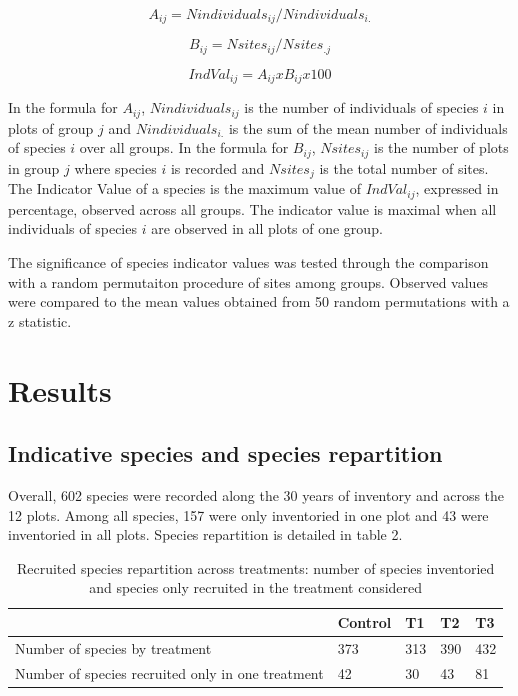 \documentclass[fleqn,10pt]{ArtEcoFoG} %
\begin{document}
\begin{equation}
A_{ij} = Nindividuals_{ij} / Nindividuals_{i.}
\end{equation}

\begin{equation}
B_{ij} = Nsites_{ij} / Nsites_{.j}
\end{equation}

\begin{equation}
IndVal_{ij} = A_{ij} x B_{ij} x 100
\end{equation}

In the formula for \(A_{ij}\), \(Nindividuals_{ij}\) is the number of individuals of species \(i\) in plots of group \(j\) and \(Nindividuals_{i.}\) is the sum of the mean number of individuals of species \(i\) over all groups.
In the formula for \(B_{ij}\), \(Nsites_{ij}\) is the number of plots in group \(j\) where species \(i\) is recorded and \(Nsites_{j}\) is the total number of sites.
The Indicator Value of a species is the maximum value of \(IndVal_{ij}\), expressed in percentage, observed across all groups.
The indicator value is maximal when all individuals of species \(i\) are observed in all plots of one group.

The significance of species indicator values was tested through the comparison with a random permutaiton procedure of sites among groups.
Observed values were compared to the mean values obtained from 50 random permutations with a z statistic.
\color{black}

\hypertarget{results}{%
\section{Results}\label{results}}

\color{red}

\hypertarget{indicative-species-and-species-repartition}{%
\subsection{Indicative species and species repartition}\label{indicative-species-and-species-repartition}}

Overall, 602 species were recorded along the 30 years of inventory and across the 12 plots.
Among all species, 157 were only inventoried in one plot and 43 were inventoried in all plots.
Species repartition is detailed in table 2.

\begin{table}[t]

\caption{\label{tab:Tab2}Recruited species repartition across treatments: number of species inventoried and species only recruited in the treatment considered}
\centering
\begin{tabu} to 
\toprule
 & Control & T1 & T2 & T3\\
\midrule
Number of species by treatment & 373 & 313 & 390 & 432\\
Number of species recruited only in one treatment & 42 & 30 & 43 & 81\\
\bottomrule
\end{tabu}
\end{table}\ignorespacesafterend
\end{document}
